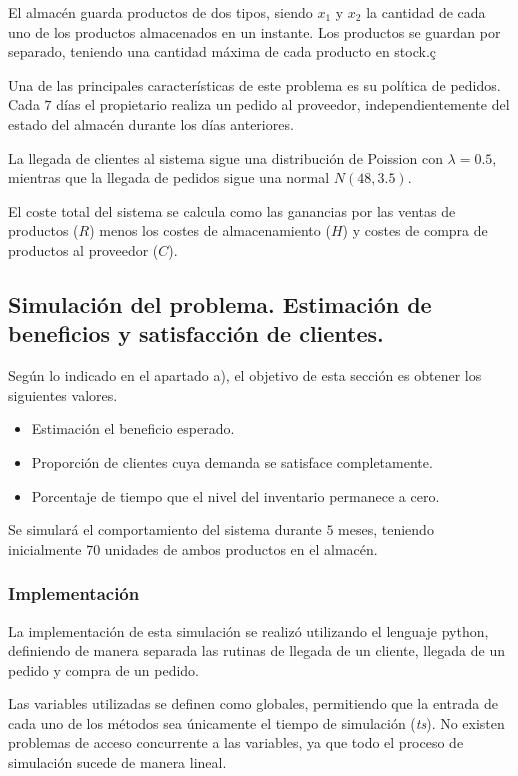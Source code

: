 \documentclass[a4paper,12pt]{article}
\begin{document}
	El almacén guarda productos de dos tipos, siendo $x_1$ y $x_2$ la cantidad de cada uno de los productos almacenados en un instante. Los productos se guardan por separado, teniendo una cantidad máxima de cada producto en stock.ç
	
	Una de las principales características de este problema es su política de pedidos. Cada $7$ días el propietario realiza un pedido al proveedor, independientemente del estado del almacén durante los días anteriores.
	
	La llegada de clientes al sistema sigue una distribución de Poission con $\lambda = 0.5$, mientras que la llegada de pedidos sigue una normal $N(48, 3.5)$.
	
	El coste total del sistema se calcula como las ganancias por las ventas de productos ($R$) menos los costes de almacenamiento ($H$) y costes de compra de productos al proveedor ($C$).
	
	
	
	\subsection{Simulación del problema. Estimación de beneficios y satisfacción de clientes.}
	Según lo indicado en el apartado a), el objetivo de esta sección es obtener los siguientes valores.
	\begin{itemize}
		\item Estimación el beneficio esperado.
		\item Proporción de clientes cuya demanda se satisface completamente.
		\item Porcentaje de tiempo que el nivel del inventario permanece a cero.
	\end{itemize}
	Se simulará el comportamiento del sistema durante $5$ meses, teniendo inicialmente $70$ unidades de ambos productos en el almacén.
	 	
	\subsubsection{Implementación}
	La implementación de esta simulación se realizó utilizando el lenguaje python, definiendo de manera separada las rutinas de llegada de un cliente, llegada de un pedido y compra de un pedido.
	
	Las variables utilizadas se definen como globales, permitiendo que la entrada de cada uno de los métodos sea únicamente el tiempo de simulación (\textit{ts}). No existen problemas de acceso concurrente a las variables, ya que todo el proceso de simulación sucede de manera lineal.
	
\end{document}
